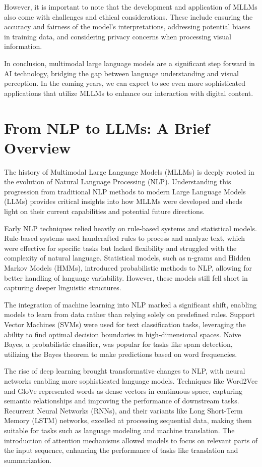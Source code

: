 However, it is important to note that the development and application of MLLMs also come with challenges and ethical considerations. These include ensuring the accuracy and fairness of the model's interpretations, addressing potential biases in training data, and considering privacy concerns when processing visual information.

In conclusion, multimodal large language models are a significant step forward in AI technology, bridging the gap between language understanding and visual perception. In the coming years, we can expect to see even more sophisticated applications that utilize MLLMs to enhance our interaction with digital content.

\section{From NLP to LLMs: A Brief Overview}

The history of Multimodal Large Language Models (MLLMs) is deeply rooted in the evolution of Natural Language Processing (NLP). Understanding this progression from traditional NLP methods to modern Large Language Models (LLMs) provides critical insights into how MLLMs were developed and sheds light on their current capabilities and potential future directions.

Early NLP techniques relied heavily on rule-based systems and statistical models. Rule-based systems used handcrafted rules to process and analyze text, which were effective for specific tasks but lacked flexibility and struggled with the complexity of natural language. Statistical models, such as n-grams and Hidden Markov Models (HMMs), introduced probabilistic methods to NLP, allowing for better handling of language variability. However, these models still fell short in capturing deeper linguistic structures.

The integration of machine learning into NLP marked a significant shift, enabling models to learn from data rather than relying solely on predefined rules. Support Vector Machines (SVMs) were used for text classification tasks, leveraging the ability to find optimal decision boundaries in high-dimensional spaces. Naive Bayes, a probabilistic classifier, was popular for tasks like spam detection, utilizing the Bayes theorem to make predictions based on word frequencies.

The rise of deep learning brought transformative changes to NLP, with neural networks enabling more sophisticated language models. Techniques like Word2Vec and GloVe represented words as dense vectors in continuous space, capturing semantic relationships and improving the performance of downstream tasks. Recurrent Neural Networks (RNNs), and their variants like Long Short-Term Memory (LSTM) networks, excelled at processing sequential data, making them suitable for tasks such as language modeling and machine translation. The introduction of attention mechanisms allowed models to focus on relevant parts of the input sequence, enhancing the performance of tasks like translation and summarization.

